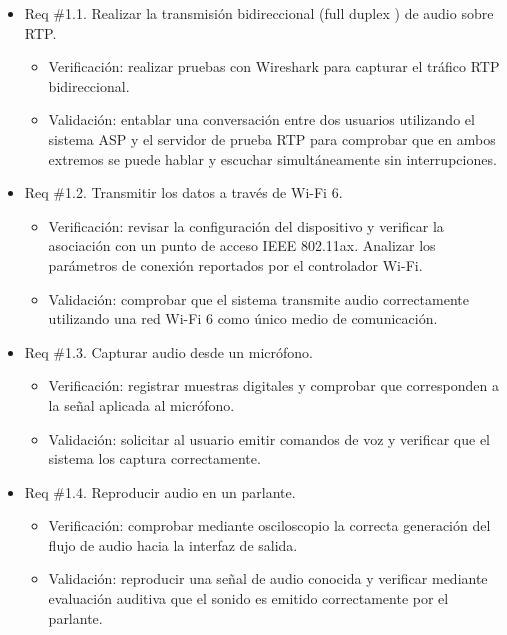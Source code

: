 \documentclass[
11pt, %
]{charter}
\begin{document}
\begin{itemize} 

	\item Req \#1.1. Realizar la transmisión bidireccional (full duplex ) de audio sobre RTP.
	\begin{itemize}
		\item Verificación: realizar pruebas con Wireshark para capturar el tráfico RTP bidireccional.
		\item Validación: entablar una conversación entre dos usuarios utilizando el sistema ASP y el servidor de prueba RTP para comprobar que en ambos extremos se puede hablar y escuchar simultáneamente sin interrupciones.
	\end{itemize}
	
	\item Req \#1.2. Transmitir los datos a través de Wi-Fi 6. 
	\begin{itemize}
		\item Verificación: revisar la configuración del dispositivo y verificar la asociación con un punto de acceso IEEE 802.11ax. Analizar los parámetros de conexión reportados por el controlador Wi-Fi.
		\item Validación: comprobar que el sistema transmite audio correctamente utilizando una red Wi-Fi 6 como único medio de comunicación.
	\end{itemize}
	
	\item Req \#1.3. Capturar audio desde un micrófono.
	\begin{itemize}
		\item Verificación: registrar muestras digitales y comprobar que corresponden a la señal aplicada al micrófono.
		\item Validación: solicitar al usuario emitir comandos de voz y verificar que el sistema los captura correctamente.
	\end{itemize}
	
	\item Req \#1.4. Reproducir audio en un parlante.
	\begin{itemize}
		\item Verificación: comprobar mediante osciloscopio la correcta generación del flujo de audio hacia la interfaz de salida.
		\item Validación: reproducir una señal de audio conocida y verificar mediante evaluación auditiva que el sonido es emitido correctamente por el parlante.
	\end{itemize}
	

\end{itemize}
\end{document}

